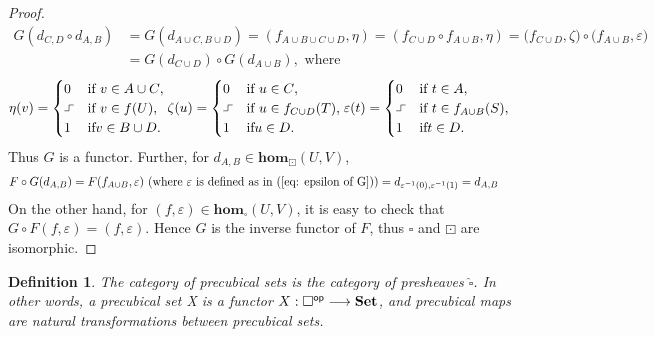 \documentclass[11pt,a4paper,oldfontcommands]{memoir}
\newcommand*\exec{%
  \raisebox{1pt}{%
    \begin{tikzpicture}[x=.8ex,y=1ex,-]
      \draw (0,0) -- (1,0) -- (1,1) -- (2,1);
    \end{tikzpicture}}}
\newtheorem{definition}{Definition}
\begin{document}
\begin{proof}
\begin{align*}
G(d_{C, D} \circ d_{A, B})& =G(d_{A \cup C, B \cup D})=(f_{A \cup B \cup C \cup D },\eta)=(f_{ C \cup D } \circ f_{ A \cup B },\eta) =\bigl( f_{ C \cup D },\zeta \bigl) \circ \bigl( f_{ A \cup B } ,\varepsilon \bigl)\\
& =G(d_{C \cup D}) \circ G(d_{A \cup B}), \text{ where}
\end{align*} \begin{equation*}
      \eta(v)=
      \begin{cases}
        0 & \text{if $v\in A\cup C$}, \\
        \exec & \text{if $v\in f(U)$}, \\
        1 & \text{if} v \in B \cup D.
      \end{cases} \zeta(u)=
       \begin{cases}
        0 & \text{if $u\in  C$}, \\
        \exec & \text{if $u\in f_{C \cup D}(T)$}, \\
        1 & \text{if} u \in D.
      \end{cases} 
       \varepsilon(t)=
       \begin{cases}
        0 & \text{if $t\in  A$}, \\
        \exec & \text{if $t\in f_{A \cup B}(S)$}, \\
        1 & \text{if} t \in D.
      \end{cases}
    \end{equation*}
Thus $G$ is a functor. Further, for $d_{A,B} \in \mathbf{hom}_{\boxdot}(U,V)$,
\begin{align*}
   F \circ G (d_{A,B})& =F(f_{A\cup B},\varepsilon)\text{ (where $\varepsilon$ is defined as in (\ref{eq: epsilon of G}))}
                     = d_{\varepsilon^{-1}(0),\varepsilon^{-1}(1)}
                       = d_{A,B}
\end{align*}
On the other hand, for $(f,\varepsilon) \in  \mathbf{hom}_{\square}(U,V)$, it is easy to check that $ G \circ F (f,\varepsilon)=(f,\varepsilon)$. Hence $G$ is the inverse functor of $F$, thus $\square$ and $\boxdot$ are isomorphic.

 \end{proof}
 
\begin{definition}
    The category of precubical sets is the category of presheaves $\widehat{\square}$. In other words, a precubical set X is a functor $X : \square^{\textsf{\textsf{op}}} \longrightarrow \mathbf{Set}$, and precubical maps are natural transformations between precubical sets.
\end{definition}
\end{document}
